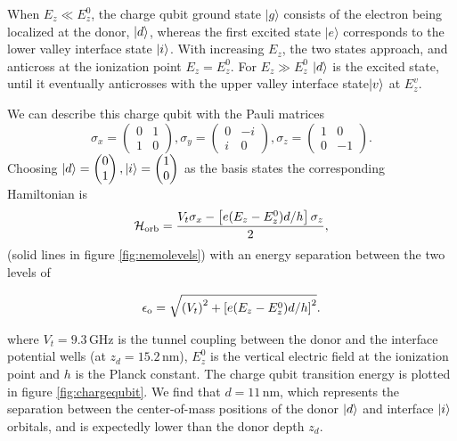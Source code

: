 When $E_z \ll E_z^0$, the charge qubit ground state $\lvert g \rangle $ consists of the electron being  localized at the donor, $\ket{d}$, whereas the first excited state $\lvert e \rangle $ corresponds to the lower valley interface state $\ket{i}$. 
With increasing $E_z$, the two states approach, and anticross at the ionization point $E_z = E_z^0$. For $E_z\gg E_z^0$ $\ket{d}$ is the excited state, until it eventually anticrosses with the upper valley interface state$\ket{v}$ at $E_z^v$. 

We can describe this charge qubit with the Pauli matrices 
\begin{equation}\sigma_x=\begin{pmatrix}0 & 1\\1 &0 \end{pmatrix}, \sigma_y=\begin{pmatrix}0 &-i\\i &0 \end{pmatrix}, \sigma_z=\begin{pmatrix}1 &0\\0 &-1 \end{pmatrix}.
\end{equation} 
Choosing $\ket{d}=\begin{pmatrix}0\\1 \end{pmatrix},\ket{i}=\begin{pmatrix}1\\0\end{pmatrix}$ as the basis states the corresponding Hamiltonian is
\begin{equation} \label{eq:H_orb}
\mathcal{H}_{\rm orb}=\frac{V_t \sigma_x-\left[e(E_z - E_z^0) d/h\right]\sigma_z}{2},
\end{equation}
(solid lines in figure \ref{fig:nemolevels}) with an energy separation between the two levels of 

\begin{equation} \label{eq:e_o}
\epsilon_{\rm o}=\sqrt{\left(V_t\right)^2+\left[e(E_z - E_z^0) d/h\right]^2}.
\end{equation}

where $V_t=9.3\,$GHz is the tunnel coupling between the donor and the interface potential wells (at $z_d=15.2\,$nm), $E_z^0$ is the vertical electric field at the ionization point and $h$ is the Planck constant. The charge qubit transition energy is plotted in figure \ref{fig:chargequbit}.  We find that $d=11\,$nm, which represents the separation between the center-of-mass positions of the donor $\ket{d}$ and interface $\ket{i}$ orbitals, and is expectedly lower than the donor depth $z_d$.

